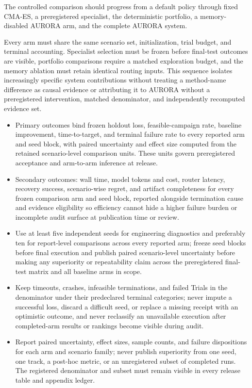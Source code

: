 The controlled comparison should progress from a default policy through
fixed CMA-ES, a preregistered specialist, the deterministic portfolio, a
memory-disabled AURORA arm, and the complete AURORA system.

Every arm must share the same scenario
set, initialization, trial budget, and terminal accounting. Specialist
selection must be frozen before final-test outcomes are visible,
portfolio comparisons require a matched exploration budget, and the
memory ablation must retain identical routing inputs. This sequence
isolates increasingly specific system contributions without treating a
method-name difference as causal evidence or attributing it to AURORA
without a preregistered intervention, matched denominator, and
independently recomputed evidence set.

\begin{itemize}
\item
  Primary outcomes bind frozen holdout loss, feasible-campaign rate,
  baseline improvement, time-to-target, and terminal failure rate to
  every reported arm and seed block, with paired uncertainty and effect
  size computed from the retained scenario-level comparison units.
  These units govern preregistered acceptance and arm-to-arm inference at
  release.
\item
  Secondary outcomes: wall time, model tokens and cost, router latency,
  recovery success, scenario-wise regret, and artifact completeness for
  every frozen comparison arm and seed block, reported alongside
  termination cause and evidence eligibility so efficiency cannot hide a
  higher failure burden or incomplete audit surface at publication time
  or review.
\item
  Use at least five independent seeds for engineering diagnostics and
  preferably ten for report-level comparisons across every reported arm;
  freeze seed blocks before final execution and publish paired
  scenario-level uncertainty before making any superiority or
  repeatability claim across the preregistered final-test matrix and all
  baseline arms in scope.
\item
  Keep timeouts, crashes, infeasible terminations, and failed Trials in
  the denominator under their predeclared terminal categories; never
  impute a successful loss, discard a difficult seed, or replace a
  missing receipt with an optimistic outcome, and never reclassify an
  unavailable execution after completed-arm results or rankings become
  visible during audit.
\item
  Report paired uncertainty, effect sizes, sample counts, and failure
  dispositions for each arm and scenario family; never publish
  superiority from one seed, one track, a post-hoc metric, or an
  unregistered subset of completed runs. The registered denominator and
  subset must remain visible in every release table and appendix ledger.
\end{itemize}

